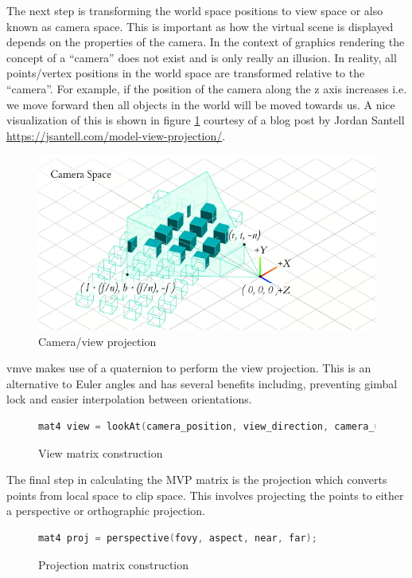 \documentclass[11pt]{article}
\begin{document}
The next step is transforming the world space positions to view space or also
known as camera space. This is important as how the virtual scene is displayed
depends on the properties of the camera. In the context of graphics rendering
the concept of a ``camera'' does not exist and is only really an illusion. In
reality, all points/vertex positions in the world space are transformed relative
to the ``camera''. For example, if the position of the camera along the z axis
increases i.e. we move forward then all objects in the world will be moved
towards us. A nice visualization of this is shown in figure
\ref{fig:camera_projection} courtesy of a blog post by Jordan Santell
\href{https://jsantell.com/model-view-projection/}{https://jsantell.com/model-view-projection/}.

\begin{figure}[h!]
  \centering
  \includegraphics[width=\textwidth]{images/camera_space.png}
  \caption{Camera/view projection \cite{camera_projection}}
  \label{fig:camera_projection} 
\end{figure}

\gls{vmve} makes use of a quaternion to perform the view projection. This is an
alternative to Euler angles and has several benefits including, preventing gimbal
lock and easier interpolation between orientations.
\begin{figure}[ht]
  \centering
  \begin{lstlisting}[language=C++]
    mat4 view = lookAt(camera_position, view_direction, camera_up);
  \end{lstlisting}
  \caption{View matrix construction}
  \label{fig:world_to_view}
\end{figure}


The final step in calculating the MVP matrix is the projection which converts
points from local space to clip space. This involves projecting the points to
either a perspective or orthographic projection.
\begin{figure}[ht]
  \centering
  \begin{lstlisting}[language=C++]
    mat4 proj = perspective(fovy, aspect, near, far);
  \end{lstlisting}
  \caption{Projection matrix construction}
  \label{fig:local_to_projection}
\end{figure}
\end{document}
